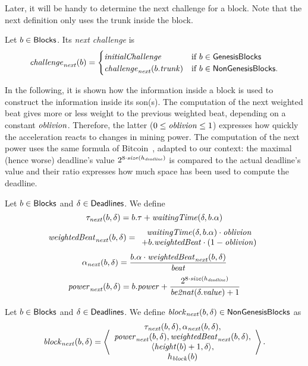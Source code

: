 Later, it will be handy to determine the next challenge for a block. Note that
the next definition only uses the trunk inside the block.
%
\begin{definition}\label{def:next_challenge_from_block}
  Let $b\in{\mathsf{Blocks}}$. Its \emph{next challenge} is
  \[
  {\mathit{challenge}}_{\mathit{next}}(b)=\begin{cases}
  {\mathit{initialChallenge}} & \text{if $b\in{\mathsf{GenesisBlocks}}$}\\
  {\mathit{challenge}}_{\mathit{next}}(b.{\mathit{trunk}}) & \text{if $b\in{\mathsf{NonGenesisBlocks}}$.}
  \end{cases}
  \]
\end{definition}

In the following, it is shown how the information inside a block is used to construct
the information inside its son(s). The computation of the next weighted beat
gives more or less weight to the previous weighted beat, depending on a constant ${\mathit{oblivion}}$.
Therefore, the latter ($0\le{\mathit{oblivion}}\le 1$) expresses how quickly the acceleration reacts to changes
in mining power. The computation of the next power uses the same formula of Bitcoin~\cite{WalkerG24},
adapted to our context: the maximal (hence worse) deadline's value $2^{8\cdot{\mathit{size}}(h_{\mathit{deadline}})}$ is compared
to the actual deadline's value and their ratio expresses how much space has been used to compute the deadline.
%
\begin{definition}\label{def:next}
  Let $b\in{\mathsf{Blocks}}$ and $\delta\in{\mathsf{Deadlines}}$. We define
  \[
  \tau_{\mathit{next}}(b,\delta)=b.\tau+{\mathit{waitingTime}}(\delta,b.\alpha)
  \]
  \[
  \mathit{weightedBeat}_{\mathit{next}}(b,\delta)=\begin{array}{c}
  {\mathit{waitingTime}}(\delta,b.\alpha)\cdot{\mathit{oblivion}}\\
  +b.\mathit{weightedBeat}\cdot(1-{\mathit{oblivion}})
  \end{array}
  \]
  \[
  \alpha_{\mathit{next}}(b,\delta)=\frac{b.\alpha\cdot\mathit{weightedBeat}_{\mathit{next}}(b,\delta)}{{\mathit{beat}}}
  \]
  \[
  {\mathit{power}}_{\mathit{next}}(b,\delta)=b.{\mathit{power}}+\frac{2^{8\cdot{\mathit{size}}(h_{\mathit{deadline}})}}{{\mathit{be2nat}}(\delta.\mathit{value})+1}
  \]
\end{definition}
%
\begin{definition}\label{def:next_block}
  Let $b\in{\mathsf{Blocks}}$ and $\delta\in{\mathsf{Deadlines}}$. We define
  ${\mathit{block}}_{\mathit{next}}(b,\delta)\in{\mathsf{NonGenesisBlocks}}$ as
  \[
  {\mathit{block}}_{\mathit{next}}(b,\delta)=\left\langle\begin{array}{c}
  \tau_{\mathit{next}}(b,\delta),\alpha_{\mathit{next}}(b,\delta),\\
  {\mathit{power}}_{\mathit{next}}(b,\delta),\mathit{weightedBeat}_{\mathit{next}}(b,\delta),\\
  \langle{\mathit{height}}(b)+1,\delta\rangle,\\
  h_{\mathit{block}}(b)
  \end{array}\right\rangle.
  \]
\end{definition}

